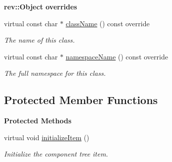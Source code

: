 \begin{Indent}\textbf{ rev\+::Object overrides}\par
\begin{DoxyCompactItemize}
\item 
virtual const char $\ast$ \mbox{\hyperlink{classrev_1_1_view_1_1_tree_item_a8a12a6ceece6cab7a2299da2b5e6a54b}{class\+Name}} () const override
\begin{DoxyCompactList}\small\item\em The name of this class. \end{DoxyCompactList}\item 
virtual const char $\ast$ \mbox{\hyperlink{classrev_1_1_view_1_1_tree_item_a3bb552a87176f4b12848e43dfdd287b2}{namespace\+Name}} () const override
\begin{DoxyCompactList}\small\item\em The full namespace for this class. \end{DoxyCompactList}\end{DoxyCompactItemize}
\end{Indent}
\subsection*{Protected Member Functions}
\begin{Indent}\textbf{ Protected Methods}\par
\begin{DoxyCompactItemize}
\item 
\mbox{\label{classrev_1_1_view_1_1_tree_item_a23cb0b6e2a6883585e76ca25edd65d49}} 
virtual void \mbox{\hyperlink{classrev_1_1_view_1_1_tree_item_a23cb0b6e2a6883585e76ca25edd65d49}{initialize\+Item}} ()
\begin{DoxyCompactList}\small\item\em Initialize the component tree item. \end{DoxyCompactList}\end{DoxyCompactItemize}
\end{Indent}
